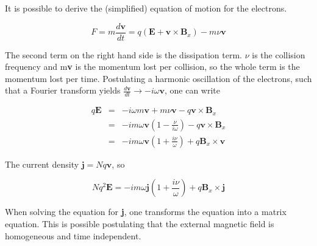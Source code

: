\documentclass[a4paper,14pt]{extbook}
\begin{document}
It is possible to derive the (simplified) equation of motion for the electrons.

\begin{equation}\label{eq_of_motion_electrons}
    F=m\frac{d\mathbf{v}}{dt}=q(\mathbf{E}+\mathbf{v} \times \mathbf{B}_x) - m\nu \textbf{v}
\end{equation}

The second term on the right hand side is the dissipation term. $\nu$ is the collision frequency and m\textbf{v} is the momentum lost per collision, so the whole term is the momentum lost per time. Postulating a harmonic oscillation of the electrons, such that a Fourier transform yields $\frac{d\mathbf{v}}{dt}\rightarrow-i \omega \mathbf{v}$, one can write

\begin{eqnarray}
    q\mathbf{E}&=&-i \omega m \mathbf{v} + m \nu \mathbf{v}-q\mathbf{v} \times \mathbf{B}_x\\
    &=& -i m \omega \mathbf{v} \left( 1   -  \frac{\nu}{i \omega}\right) -q\mathbf{v} \times \mathbf{B}_x\nonumber \\
&=& -i m \omega \mathbf{v} \left( 1   +  \frac{i \nu}{ \omega}\right) +q \mathbf{B}_x \times \mathbf{v} \nonumber
\end{eqnarray}

The current density $\mathbf{j}=Nq\mathbf{v}$, so

\begin{equation}\label{get_conductivity}
    Nq^2\mathbf{E}= -i m \omega \mathbf{j} \left( 1   +  \frac{i \nu}{ \omega}\right) +q \mathbf{B}_x \times \mathbf{j}
\end{equation}

When solving the equation for \textbf{j}, one transforms the equation into a matrix equation. This is possible postulating that the external magnetic field is homogeneous and time independent.
\end{document}
